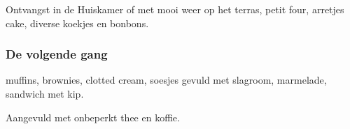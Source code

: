 Ontvangst in de Huiskamer of met mooi weer op het terras,
petit four, arretjes cake, diverse koekjes
en bonbons.

\subsubsection*{De volgende gang}
muffins, brownies, clotted cream, soesjes gevuld met slagroom, marmelade,
 sandwich met kip.

Aangevuld met onbeperkt thee en koffie.
